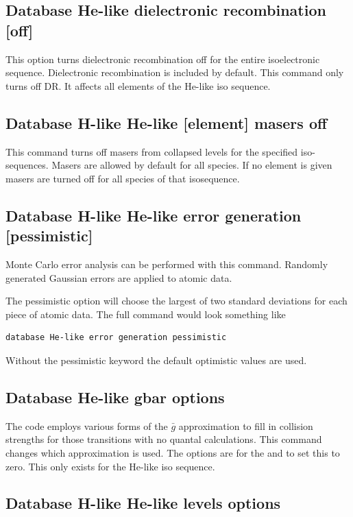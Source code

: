 \subsection{Database He-like dielectronic recombination [off] }

This option turns dielectronic recombination off for the entire
isoelectronic sequence.
Dielectronic recombination is included by default.
This command only turns off DR.
It affects all elements of the He-like iso sequence.

\subsection{Database H-like \OR{} He-like [element] masers off }

This command turns off masers from collapsed levels for the specified
iso-sequences. Masers are allowed by default for all species. If no 
element is given masers are turned off for all species of that isosequence.

\subsection{Database H-like \OR{} He-like error generation [pessimistic]}

Monte Carlo error analysis can be performed with this command.
Randomly
generated Gaussian errors are applied to atomic data.

The pessimistic option will choose the largest of two standard deviations
for each piece of atomic data.
The full command would look something like
\begin{verbatim}
database He-like error generation pessimistic
\end{verbatim}
Without the
pessimistic keyword the default optimistic values are used.

\subsection{Database He-like gbar options}

The code employs various forms of the $\bar g$
approximation to fill in collision strengths for those transitions with
no quantal calculations.
This command changes which approximation is used.
The options are  for the \citet{Vriens1980} and
 to set this to zero.
This only exists for the He-like iso sequence.

\subsection{Database H-like \OR{} He-like levels options}

